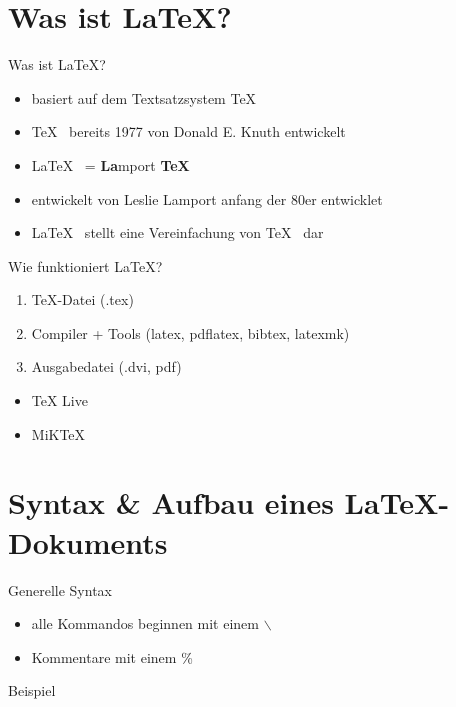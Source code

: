 
\section{Was ist \LaTeX ?}

\begin{frame}{Was ist \LaTeX ?}
	\begin{itemize}[<+->]
	\item basiert auf dem Textsatzsystem \TeX
	\item \TeX \mbox{ } bereits 1977 von Donald E. Knuth entwickelt
	\item \LaTeX \mbox{ } = \textbf{La}mport \textbf{TeX}
	\item entwickelt von Leslie Lamport anfang der 80er entwicklet
	\item \LaTeX \mbox{ } stellt eine Vereinfachung von \TeX \mbox{ } dar
	\end{itemize}
\end{frame}

\begin{frame}{Wie funktioniert \LaTeX?}
	\begin{enumerate}[<+->]
	\item \TeX -Datei (.tex)
	\item Compiler + Tools (latex, pdflatex, bibtex, latexmk)
	\item Ausgabedatei (.dvi, pdf)
	\end{enumerate}

	\begin{itemize}[<+->]
	\item TeX Live
	\item MiKTeX
	\end{itemize}
\end{frame}

\section{Syntax \& Aufbau eines \LaTeX -Dokuments}

\begin{frame}{Generelle Syntax}
	\begin{itemize}[<+->]
		\item alle Kommandos beginnen mit einem $\backslash$
		\item Kommentare mit einem \%
	\end{itemize}
\end{frame}
\begin{frame}{Beispiel}
	\begin{Code}
		
	\end{Code}

\end{frame}